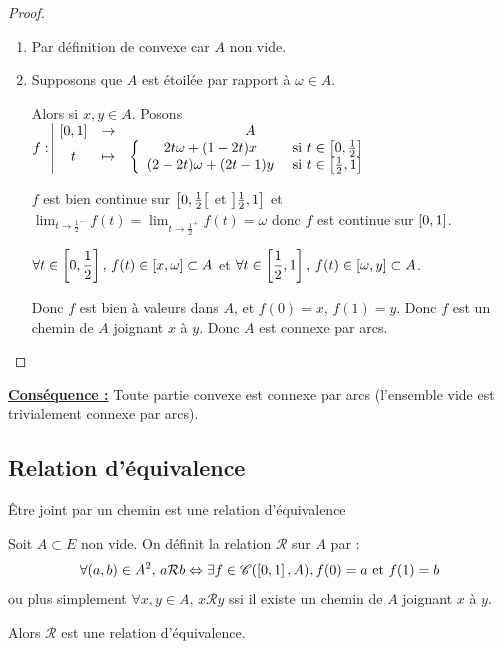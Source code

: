 \begin{proof}~
    \begin{enumerate}
        \item Par définition de convexe car $A$ non vide. 

        \item Supposons que $A$ est étoilée par rapport à $\omega \in A$.

        Alors si $x, y \in A$. Posons $f: \space \begin{array}{|ccc}
        \left[0, 1\right] & \to & A \\
        t & \mapsto & \left\{ \begin{array}{cc}
            2t \omega + (1 - 2t)x & \text{ si } t \in \left[0, \frac 1 2\right] \\
            (2 - 2t) \omega + (2t - 1)y & \text{ si } t \in \left[\frac 1 2, 1\right]        
        \end{array} \right.
        \end{array}$

        $f$ est bien continue sur $\left[0, \frac 1 2\right[$ et $\left]\frac 1 2, 1\right]$ et 
        $\displaystyle \lim_{t \to \frac 1 2^-} f(t) = \lim_{t \to \frac 1 2^+} f(t) = \omega$ donc $f$ est continue sur $\left[0, 1\right]$.

        $\displaystyle \forall t \in \left[0, \frac 1 2\right], \, f(t) \in \left[x, \omega\right] \subset A$ et
        $\displaystyle \forall t \in \left[\frac 1 2, 1\right], \, f(t) \in \left[\omega, y\right] \subset A$.

        Donc $f$ est bien à valeurs dans $A$, et $f(0) = x$, $f(1) = y$. 
        Donc $f$ est un chemin de $A$ joignant $x$ à $y$. Donc $A$ est connexe par arcs.
    \end{enumerate}
\end{proof}

\textbf{\uline{Conséquence :}} Toute partie convexe est connexe par arcs (l'ensemble vide est trivialement connexe par arcs).

\subsection{Relation d'équivalence}

\begin{theoreme}{Être joint par un chemin est une relation d'équivalence}{}

    Soit $A \subset E$ non vide.
    On définit la relation $\mathcal R$ sur $A$ par : 
    \[\forall (a, b) \in A^2, \, a \mathcal R b \Leftrightarrow \exists f \in \mathscr C(\left[0, 1\right], A), f(0) = a \text{ et } f(1) = b\]
    ou plus simplement $\forall x, y \in A, \, x \mathcal R y$ ssi il existe un chemin de $A$ joignant $x$ à $y$.
    
    Alors $\mathcal R$ est une relation d'équivalence.
\end{theoreme}

